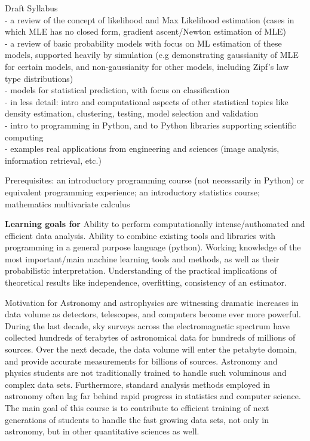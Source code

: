 \bit
\item \statcl Draft Syllabus\\
- a review of the concept of likelihood and Max Likelihood estimation (cases in which MLE has no closed form, gradient ascent/Newton estimation of MLE)\\
- a review of basic probability models with focus on ML estimation of these models, supported heavily by simulation (e.g demonstrating gaussianity of MLE for certain models, and non-gaussianity for other models, including Zipf's law type distributions)\\
- models for statistical prediction, with focus on classification\\
- in less detail: intro and computational aspects of other statistical topics like density estimation, clustering, testing, model selection and validation\\
- intro to programming in Python, and to Python libraries supporting scientific computing\\
- examples real applications from engineering and sciences (image analysis, information retrieval, etc.)

Prerequisites: an introductory programming course (not necessarily in Python) or equivalent programming experience; an introductory statistics course; mathematics multivariate calculus

\item[]{\bf Learning goals for \statcl} Ability to perform computationally intense/authomated and efficient data analysis. Ability to combine existing tools and libraries with programming in a general purpose language (python). 
Working knowledge of the most important/main machine learning tools and methods, as well as their probabilistic interpretation. Understanding of the practical implications of theoretical results like independence, overfitting, consistency of an estimator. 

\item{Motivation for \astrocl} 
Astronomy and astrophysics are witnessing dramatic increases in data volume 
as detectors, telescopes, and computers become ever more powerful. During the 
last decade, sky surveys across the electromagnetic spectrum have collected 
hundreds of terabytes of astronomical data for hundreds of millions of sources. 
Over the next decade, the data volume will enter the petabyte domain, and provide 
accurate measurements for billions of sources. Astronomy and physics students 
are not traditionally trained to handle such voluminous and complex data sets. 
Furthermore, standard analysis methods employed in astronomy often lag far 
behind rapid progress in statistics and computer science. The main
goal of this course is to contribute to efficient training of next
generations of students to 
handle the fast growing data sets, not only in astronomy, but in other quantitative 
sciences as well. 

